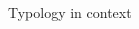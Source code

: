 \documentclass[9pt]{beamer}
\begin{document}
\begin{frame}{Typology in context}
\begin{columns}
	\begin{column}{0.618\linewidth}
		\begin{figure}

\end{figure}
\end{column}
\end{columns}
\end{frame}
\end{document}
